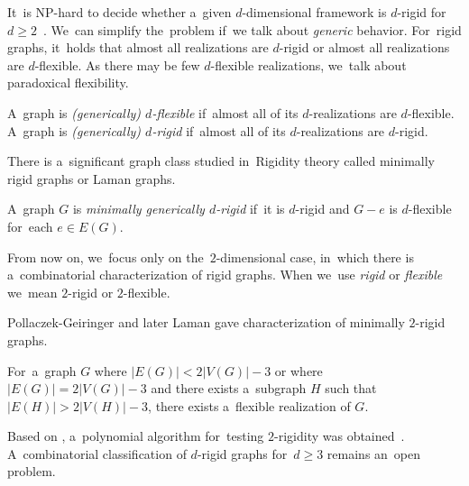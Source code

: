 It~is NP-hard to decide whether a~given \( d \)-dimensional framework is
\( d \)-rigid for~\( d \ge 2 \)~\cite{d_rigidity_hardness}.
We~can simplify the~problem if~we talk about \emph{generic} behavior.
%
For~rigid graphs, it~holds that almost all%
realizations are \( d \)-rigid or almost all realizations are \( d \)-flexible.
As there may be few \( d \)-flexible realizations,
we~talk about paradoxical flexibility.
%
\begin{definition}
	A~graph is \emph{(generically) \( d \)-flexible} if~almost all of
	its \( d \)-realizations are \( d \)-flexible.
	A~graph is \emph{(generically) \( d \)-rigid} if~almost all of
	its \( d \)-realizations are \( d \)-rigid.
\end{definition}
%


There is a~significant graph class studied in~Rigidity theory
called minimally rigid graphs or Laman graphs.
%
\begin{definition}
	A~graph \( G \) is \emph{minimally generically \( d \)-rigid} if~it is \( d \)-rigid
	and \( G - e \) is \(d\)-flexible for~each \( e \in E(G) \).
\end{definition}
%
From now on, we~focus only on the~\( 2 \)-dimensional case,
in~which there is a~combinatorial characterization of rigid graphs.
When we~use \emph{rigid} or \emph{flexible} we~mean \( 2 \)-rigid or \( 2 \)-flexible.

Pollaczek-Geiringer and later Laman gave characterization of minimally $2$-rigid graphs.
%
%
\begin{corollary}
	For~a~graph \( G \) where \( |E(G)| < 2|V(G)| - 3 \) or
	where \( |E(G)| = 2|V(G)| - 3 \) and there exists a~subgraph \( H \) such that \( |E(H)| > 2|V(H)| - 3 \),
	there exists a~flexible realization of \( G \).
\end{corollary}
%
Based on ,
a~polynomial algorithm
for~testing $2$-rigidity was obtained~\cite{polynomial-min-rigid}.
A~combinatorial classification of $d$-rigid graphs
for~$d \geq 3$ remains an~open problem.

